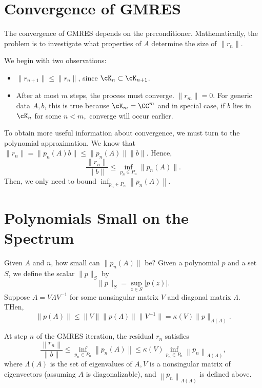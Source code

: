 \section{Convergence of GMRES} 
The convergence of GMRES depends on the preconditioner. Mathematically, the problem is to investigate what properties of $ A $ determine the size of $ \|r_n\| $.  

We begin with two observations: 
\begin{itemize}
    \item $ \|r_{n+1}\| \le \|r_n\| $, since $ \cK_n \subset  \cK_{n+1} $. 
    \item After at most $ m $ steps, the process must converge. $ \|r_m\| =0$. For generic data $ A,b $, this is true because $ \cK_m = \CC^{m} $ and in special case, if $ b $ lies in $ \cK_n $ for some $ n<m, $ converge will occur earlier. 
\end{itemize}

To obtain more useful information about convergence, we must turn to the polynomial approximation. We know that $ \|r_n\| = \|p_n(A)b\| \le \|p_n(A) \|\|b\| $. Hence, 
\[
    \frac{\|r_n\|}{\|b\|} \le \inf_{p_n \in P_n} \|p_n(A)\|.
\]
Then, we only need to bound $ \inf _{p_n \in P_n}\left\|p_n(A)\right\|$. 

\section{Polynomials Small on the Spectrum}
Given $ A  $ and $ n $, how small can $ \|p_n(A)\| $ be? Given a polynomial $ p $ and a set $ S $, we define the scalar $ \|p\|_S $ by 
\[
    \|p\|_S = \sup_{z\in S} |p(z)|. 
\] 
Suppose $ A =V\Lambda V^{-1} $ for some nonsingular matrix $ V $ and diagonal matrix $ \Lambda  $. THen, 
\[
    \|p(A)\| \le \|V\| \|p(\Lambda )\| \|V^{-1} \| = \kappa(V) \|p\|_{\Lambda (A)}. 
\]


\begin{theorem}
\label{thm: Res of GMRES bound}
At step $n$ of the GMRES iteration, the residual $r_n$ satisfies
$$
\frac{\left\|r_n\right\|}{\|b\|} \leq \inf _{p_n \in P_n}\left\|p_n(A)\right\| \leq \kappa(V) \inf _{p_n \in P_n}\left\|p_n\right\|_{\Lambda(A)},
$$
where $\Lambda(A)$ is the set of eigenvalues of $A, V$ is a nonsingular matrix of eigenvectors (assuming $A$ is diagonalizable), and $\left\|p_n\right\|_{\Lambda(A)}$ is defined above.
\end{theorem}

